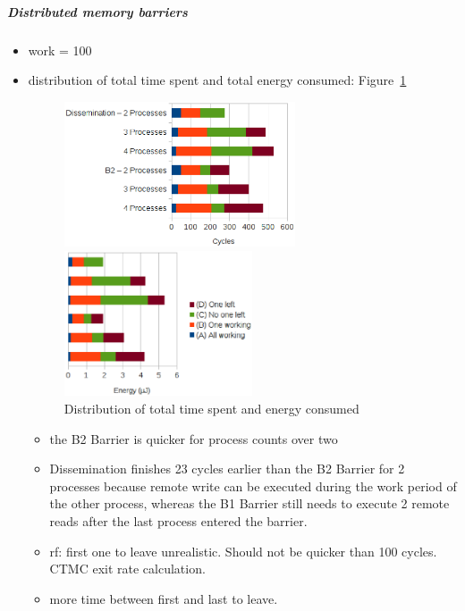 \documentclass[a4paper, 10pt]{article}
\begin{document}
\subparagraph{Distributed memory barriers}
\label{sssssec:analysis-modelchecking-quantitative-properties-results-distributed}
\begin{itemize}
	\item work = 100
	\item distribution of total time spent and total energy consumed: Figure~\ref{fig:d2-work-100-partition}
		\begin{figure}[htbp]
			\centering
			\begin{minipage}{0.54\linewidth}
				\includegraphics[height=4.3cm]{charts/d2-time-work-100-partition}
			\end{minipage}
			\begin{minipage}{0.45\linewidth}
				\includegraphics[height=4.3cm]{charts/d2-energy-work-100-partition}
			\end{minipage}
			\caption{Distribution of total time spent and energy consumed}
			\label{fig:d2-work-100-partition}
		\end{figure}
		\begin{itemize}
			\item the B2 Barrier is quicker for process counts over two
			\item Dissemination finishes 23 cycles earlier than the B2 Barrier for 2 processes because remote write can be executed during the work period of the other process, whereas the B1 Barrier still needs to execute 2 remote reads after the last process entered the barrier.
			\item rf: first one to leave unrealistic. Should not be quicker than 100 cycles. CTMC exit rate calculation.
			\item more time between first and last to leave.

\end{itemize}
\end{itemize}
\end{document}
